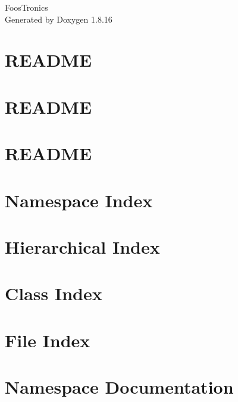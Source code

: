 \let\mypdfximage\pdfximage\def\pdfximage{\immediate\mypdfximage}\documentclass[twoside]{book}
\newcommand{\+}{\discretionary{\mbox{\scriptsize$\hookleftarrow$}}{}{}}
\newcommand{\clearemptydoublepage}{%
  \newpage{\pagestyle{empty}\cleardoublepage}%
}
\begin{document}
\hypersetup{pageanchor=false,
             bookmarksnumbered=true,
             pdfencoding=unicode
            }
\begin{titlepage}
\vspace*{7cm}
\begin{center}%
{\Large Foos\+Tronics }\\
\vspace*{1cm}
{\large Generated by Doxygen 1.8.16}\\
\end{center}
\end{titlepage}
\clearemptydoublepage
{}
\tableofcontents
\clearemptydoublepage
{}
\hypersetup{pageanchor=true}

\chapter{R\+E\+A\+D\+ME}
\label{md__r_e_a_d_m_e}

\chapter{R\+E\+A\+D\+ME}
\label{md_src__backend__r_e_a_d_m_e}

\chapter{R\+E\+A\+D\+ME}
\label{md_src__r_e_a_d_m_e}

\chapter{Namespace Index}

\chapter{Hierarchical Index}

\chapter{Class Index}

\chapter{File Index}

\chapter{Namespace Documentation}

















\end{document}
